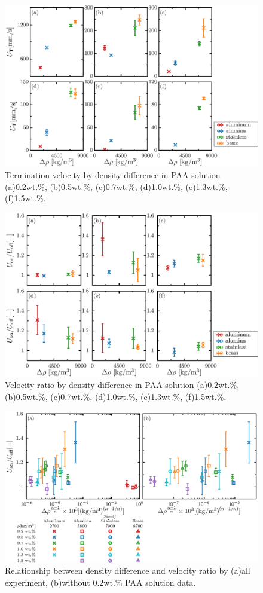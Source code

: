 \begin{figure}[ht]
    \centering
    \includegraphics[width=1.0\textwidth]{./5-Results/rhoUT.eps}
    \caption{Termination velocity by density difference in PAA solution (a)0.2wt.\%, (b)0.5wt.\%, (c)0.7wt.\%, (d)1.0wt.\%, (e)1.3wt.\%, (f)1.5wt.\%.}
    \label{fig:rhoUT}
\end{figure}

\begin{figure}[ht]
    \centering
    \includegraphics[width=1.0\textwidth]{./5-Results/rhoUdiff.eps}
    \caption{Velocity ratio by density difference in PAA solution (a)0.2wt.\%, (b)0.5wt.\%, (c)0.7wt.\%, (d)1.0wt.\%, (e)1.3wt.\%, (f)1.5wt.\%.}
    \label{fig:rhoUdiff}
\end{figure}

\begin{figure}[ht]
    \centering
    \includegraphics[width=1.0\textwidth]{./5-Results/rhoUdiffAll.eps}
    \caption{Relationship between density difference and velocity ratio by (a)all experiment, (b)without 0.2wt.\% PAA solution data.}
    \label{fig:rhoUdiffAll}
\end{figure}